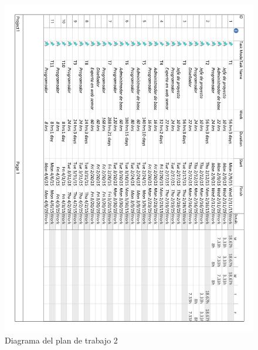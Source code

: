 \begin{figure}[!htp]
	\centering
	\includegraphics[page=2, scale=.8]{fig/work_plan_diagram}
	\caption{Diagrama del plan de trabajo 2}
\end{figure}

